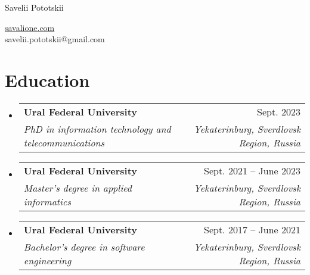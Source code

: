 \documentclass[a4paper,11pt]{article}
\makeatletter
\newcommand{\resumeItem}[1]{
    \item{
                {#1 \vspace{-4pt}}
          }
}
\newcommand{\resumeSubheading}[4]{
    \vspace{-2pt}\item
    \begin{tabular*}{0.97\textwidth}[t]{l@{\extracolsep{\fill}}r}
        \textbf{#1} & #2 \\
        \textit{\small #3} & \textit{\small #4} \\
    \end{tabular*}\vspace{-10pt}
}
\newcommand{\resumeSubHeadingListStart}{\begin{itemize}[leftmargin=0.15in, label={}]}
\newcommand{\resumeSubHeadingListEnd}{\end{itemize}}
\newcommand{\resumeItemListStart}{\begin{itemize}}
\newcommand{\resumeItemListEnd}{\end{itemize}\vspace{-2pt}}
\makeatother
\begin{document}
\begin{center}
    {\LARGE Savelii Pototskii} \\ \vspace{0pt}
    \begin{multicols}{2}
        \begin{flushleft}
        \end{flushleft}

        \begin{flushright}
            \href{https://savalione.com}{savalione.com} \\

            \href{mailto:{savelii.pototskii@gmail.com}} \large{savelii.pototskii@gmail.com}
        \end{flushright}
    \end{multicols}
\end{center}

\section{Education}
\resumeSubHeadingListStart

\resumeSubheading
    {Ural Federal University}{Sept. 2023}
    {PhD in information technology and telecommunications}{Yekaterinburg, Sverdlovsk Region, Russia}
\resumeSubheading
    {Ural Federal University}{Sept. 2021 -- June 2023}
    {Master's degree in applied informatics}{Yekaterinburg, Sverdlovsk Region, Russia}
\resumeSubheading
    {Ural Federal University}{Sept. 2017 -- June 2021}
    {Bachelor's degree in software engineering}{Yekaterinburg, Sverdlovsk Region, Russia}

\resumeSubHeadingListEnd


\end{document}

